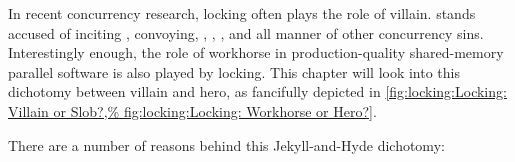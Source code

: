 
%

In recent concurrency research, locking often plays the role of villain.
 stands accused of inciting , convoying, ,
, , and all manner of other concurrency sins.
Interestingly enough, the role of workhorse in production-quality
shared-memory parallel software is also played by locking.
This chapter will look into this dichotomy between villain and
hero, as fancifully depicted in
\cref{fig:locking:Locking: Villain or Slob?,%
fig:locking:Locking: Workhorse or Hero?}.

There are a number of reasons behind this Jekyll-and-Hyde dichotomy:

